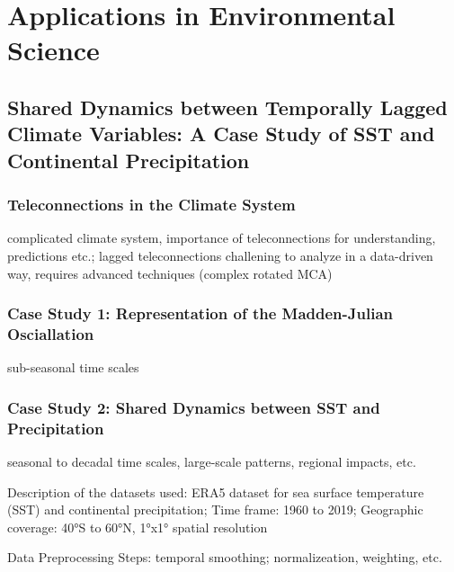\part{Applications in Environmental Science}
\chapter{Shared Dynamics between Temporally Lagged Climate Variables: A Case Study of SST and Continental Precipitation}


\ifpdf
    \graphicspath{{content/chapter4/figs/raster/}{content/chapter4/figs/pdf/}{content/chapter4/figs/}}
\else
    \graphicspath{{content/chapter4/figs/vector/}{content/chapter4/figs/}}
\fi

\section{Teleconnections in the Climate System}
complicated climate system, importance of teleconnections for understanding, predictions etc.; lagged teleconnections challening to analyze in a data-driven way, requires 
advanced techniques (complex rotated MCA)


\section{Case Study 1: Representation of the Madden-Julian Osciallation}
sub-seasonal time scales 

\section{Case Study 2: Shared Dynamics between SST and Precipitation}
seasonal to decadal time scales, large-scale patterns, regional impacts, etc.

Description of the datasets used: ERA5 dataset for sea surface temperature (SST) and continental precipitation; Time frame: 1960 to 2019; Geographic coverage: 40°S to 60°N, 1°x1° spatial resolution

Data Preprocessing Steps: temporal smoothing; normalizeation, weighting, etc.

